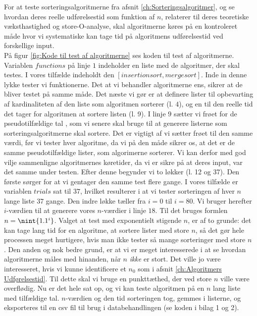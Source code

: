 For at teste sorteringsalgoritmerne fra afsnit \ref{ch:Sorteringsalgoritmer}, og se hvordan deres reelle udførelsestid som funktion af $n$, relaterer til deres teoretiske væksthastighed og store-O-analyse, skal algoritmerne køres på en kontroleret måde hvor vi systematiske kan tage tid på algoritmens udførelsestid ved forskellige input.\\

På figur \ref{fig:Kode til test af algoritmerne} ses koden til test af algoritmerne. Variablen $functions$ på linje $1$ indeholder en liste med de algoritmer, der skal testes. I vores tilfælde indeholdt den $[insertionsort,mergesort]$. Inde in denne lykke tester vi funktionerne. Det at vi behandler algoritmerne ens, sikrer at de bliver testet på samme måde. Det næste vi gør er at definere lister til opbevarting af kardinaliteten af den liste som algoritmen sorterer (l. $4$), og en til den reelle tid det tager for algoritmen at sortere listen (l. 9).  I linje $9$ sætter vi frøet for de pseudotilfældige tal \cite{python-random}, som vi senere skal bruge til at generere listerne som sorteringsalgoritmerne skal sortere. Det er vigtigt af vi sætter frøet til den samme værdi, før vi tester hver algoritme, da vi på den måde sikrer os, at det er de samme pseudotilfældige lister, som algorimerne sorterer. Vi kan derfor med god vilje sammenligne algoritmernes køretider, da vi er sikre på at deres input, var det samme under testen. Efter denne  begynder vi to løkker (l. 12 og 37). Den første sørger for at vi gentager den samme test flere gange. I vores tilfælde er variablen $trials$ sat til $37$, hvilket resulterer i at vi tester sorteringen af hver $n$ lange liste $37$ gange. Den indre løkke tæller fra $i=0$ til $i=80$. Vi bruger herefter $i$-værdien til at generere vores $n$-værdier i linje $18$. Til det bruges formlen $n=\nint{1.1^i}$. Valget at test med exponentielt stigende $n$, er af to grunde: det kan tage lang tid for en algoritme, at sortere lister med store $n$, så det gør hele processen meget hurtigere, hvis man ikke tester så mange sorteringer med store $n$. Den anden og nok bedre grund, er at vi er meget interesserede i at se hvordan algoritmerne måles med hinanden, når $n$ \emph{ikke} er stort. Det ville jo være interesseret, hvis vi kunne identificere et $n_0$ som i afsnit \ref{ch:Algoritmers Udførelsestid}. Til dette skal vi bruge en punkttæthed, der ved store $n$ ville være overflødig. Nu er det hele sat op, og vi kan teste algoritmen på en $n$ lang liste med tilfældige tal. $n$-værdien og den tid sorteringen tog, gemmes i listerne, og eksporteres til en csv fil til brug i databehandlingen (se koden i bilag 1 og 2).

